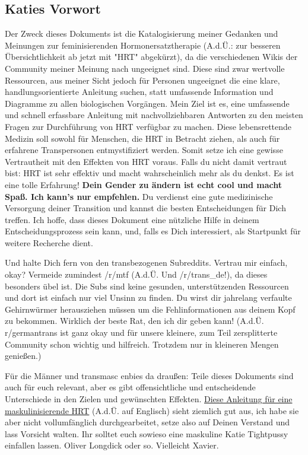 \documentclass{article}
\begin{document}
\subsection*{Katies Vorwort}
Der Zweck dieses Dokuments ist die Katalogisierung meiner Gedanken und Meinungen zur feminisierenden Hormonersatztherapie (A.d.Ü.: zur besseren Übersichtlichkeit ab jetzt mit "HRT" abgekürzt), da die verschiedenen Wikis der Community meiner Meinung nach ungeeignet sind. Diese sind zwar wertvolle Ressourcen, aus meiner Sicht jedoch für Personen ungeeignet die eine klare, handlungsorientierte Anleitung suchen, statt umfassende Information und Diagramme zu allen biologischen Vorgängen. Mein Ziel ist es, eine umfassende und schnell erfassbare Anleitung mit nachvollziehbaren Antworten zu den meisten Fragen zur Durchführung von HRT verfügbar zu machen. Diese lebensrettende Medizin soll sowohl für Menschen, die HRT in Betracht ziehen, als auch für erfahrene Transpersonen entmystifiziert werden. Somit setze ich eine gewisse Vertrautheit mit den Effekten von HRT voraus. Falls du nicht damit vertraut bist: HRT ist sehr effektiv und macht wahrscheinlich mehr als du denkst. Es ist eine tolle Erfahrung! \textbf{Dein Gender zu ändern ist echt cool und macht Spaß. Ich kann's nur empfehlen.} Du verdienst eine gute medizinische Versorgung deiner Transition und kannst die besten Entscheidungen für Dich treffen. Ich hoffe, dass dieses Dokument eine nützliche Hilfe in deinem Entscheidungsprozess sein kann, und, falls es Dich interessiert, als Startpunkt für weitere Recherche dient.

Und halte Dich fern von den transbezogenen Subreddits. Vertrau mir einfach, okay? Vermeide zumindest /r/mtf (A.d.Ü. Und /r/trans\_de!), da dieses besonders übel ist. Die Subs sind keine gesunden, unterstützenden Ressourcen und dort ist einfach nur viel Unsinn zu finden. Du wirst dir jahrelang verfaulte Gehirnwürmer herausziehen müssen um die Fehlinformationen aus deinem Kopf zu bekommen. Wirklich der beste Rat, den ich dir geben kann! (A.d.Ü. r/germantrans ist ganz okay und für unsere kleinere, zum Teil zersplitterte Community schon wichtig und hilfreich. Trotzdem nur in kleineren Mengen genießen.)

Für die Männer und transmasc enbies da draußen: Teile dieses Dokuments sind auch für euch relevant, aber es gibt offensichtliche und entscheidende Unterschiede in den Zielen und gewünschten Effekten. \href{https://mega.nz/folder/cfwSmBbY#ify6kaueB8SdDD1v12t2Dw}{Diese Anleitung für eine maskulinisierende HRT} (A.d.Ü. auf Englisch) sieht ziemlich gut aus, ich habe sie aber nicht vollumfänglich durchgearbeitet, setze also auf Deinen Verstand und lass Vorsicht walten. Ihr solltet euch sowieso eine maskuline Katie Tightpussy einfallen lassen. Oliver Longdick oder so. Vielleicht Xavier. 
\end{document}
